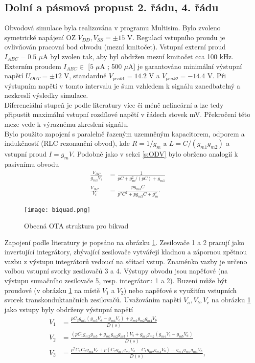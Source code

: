 \subsection{Dolní a pásmová propust 2. řádu, 4. řádu}\label{s:DP2}
\noindent Obvodová simulace byla realizována v programu Multisim. Bylo zvoleno symetrické napájení OZ $V_{DD},V_{SS} = \pm 15$ V. Regulací vstupního proudu je ovlivňován pracovní bod obvodu (mezní kmitočet). Vstupní externí proud $I_{ABC} = 0.5$ $\mu$A byl zvolen tak, aby byl obdržen mezní kmitočet cca 100 kHz. Externím proudem $I_{ABC} \in$ $[5$ $\mu$A ; 500 $\mu$A] je garantováno minimální výstupní napětí $U_{OUT} = \pm 12$ V, standardně $V_{peak 1} = 14.2$ V a $V_{peak 2} = -14.4$ V. Při výstupním napětí v tomto intervalu je šum vzhledem k signálu zanedbatelný a nezkreslí výsledky simulace.\\
\noindent Diferenciální stupeň je podle literatury \cite{5} více či méně nelineární a lze tedy připustit maximální vstupní rozdílové napětí v řádech stovek mV. Překročení této meze vede k výraznému zkreslení signálu.\\
\noindent Bylo použito zapojení s paralelně řazeným uzemněným kapacitorem, odporem a indukčností (RLC rezonanční obvod), kde $R = 1/g_m$ a $L = C/(g_{m1}g_{m2})$ a vstupní proud $I = g_mV$. Podobně jako v sekci \ref{s:ODV} bylo obrženo analogií k pasivnímu obvodu
\begin{align}
\frac{V_{BP}}{g_{m3}V_i} &= \frac{1}{pC + g_m^2/(pC) + g_{m3}}\\
\frac{V_{BP}}{V_i} &= \frac{pg_{m3}C}{p^2C^2 + pg_{m3}C + g_m^2}.
\end{align}
\begin{figure}[h]
\centering
\texttt{[image: biquad.png]}
\caption[Obecná OTA struktura pro bikvad]{Obecná OTA struktura pro bikvad \cite{16} \label{s:BIK}}
\end{figure}
\noindent Zapojení podle literatury \cite{16} je popsáno na obrázku \ref{s:BIK}. Zesilovače 1 a 2 pracují jako invertující integrátory, zbývající zesilovače vytvářejí kladnou a zápornou zpětnou vazbu z výstupu integrátorů vedoucí na sčítací vstup. Znaménko vazby je určeno volbou vstupní svorky zesilovačů 3 a 4. Výstupy obvodu jsou napěťové (na výstupu sumačního zesilovače 5, resp. integrátoru 1 a 2). Buzení může být proudové (v obrázku \ref{s:BIK} na místě $V_1$ a $V_2$) nebo napěťové s využitím vstupních svorek transkonduktančních zesilovačů. Uvažováním napětí $V_a, V_b, V_c$ na obrázku \ref{s:BIK} jako vstupy byly obdrženy výstupní napětí
\begin{align}
V_1 &= \frac{pC_2g_{m1}(g_{m5}V_a - g_{m4}V_c) + g_{m1}g_{m2}g_{m4}V_b}{D(s)}\\
V_2 &= \frac{(pC_1g_{m2}g_{m5} + g_{m1}g_{m2}g_{m3})V_b + g_{m1}g_{m2}(g_{m4}V_c - g_{m5}V_a)}{D(s)}\\
V_3 &= \frac{p^2C_1C_2g_{m4}V_c + p(C_2g_{m1}g_{m3}V_a - C_1g_{m2}g_{m4}V_b) + g_{m1}g_{m2}g_{m4}V_a}{D(s)},
\end{align}\label{s:V3}
